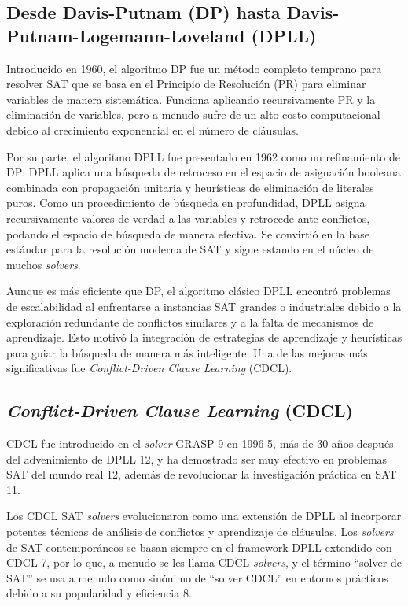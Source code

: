 \subsection{Desde Davis-Putnam (DP) hasta Davis-Putnam-Logemann-Loveland (DPLL)}
Introducido en 1960, el algoritmo DP fue un método completo temprano para resolver SAT que se basa en el Principio de Resolución (PR) para eliminar variables de manera sistemática. Funciona aplicando recursivamente PR y la eliminación de variables, pero a menudo sufre de un alto costo computacional debido al crecimiento exponencial en el número de cláusulas.

Por su parte, el algoritmo DPLL fue presentado en 1962 como un refinamiento de DP: DPLL aplica una búsqueda de retroceso en el espacio de asignación booleana combinada con propagación unitaria y heurísticas de eliminación de literales puros. Como un procedimiento de búsqueda en profundidad, DPLL asigna recursivamente valores de verdad a las variables y retrocede ante conflictos, podando el espacio de búsqueda de manera efectiva. Se convirtió en la base estándar para la resolución moderna de SAT y sigue estando en el núcleo de muchos \textit{solvers}.

Aunque es más eficiente que DP, el algoritmo clásico DPLL encontró problemas de escalabilidad al enfrentarse a instancias SAT grandes o industriales debido a la exploración redundante de conflictos similares y a la falta de mecanismos de aprendizaje. Esto motivó la integración de estrategias de aprendizaje y heurísticas para guiar la búsqueda de manera más inteligente. Una de las mejoras más significativas fue \textit{Conflict-Driven Clause Learning} (CDCL).

\subsection{\textit{Conflict-Driven Clause Learning} (CDCL)}

CDCL fue introducido en el \textit{solver} GRASP 9 en 1996 5, más de 30 años después del advenimiento de DPLL 12, y ha demostrado ser muy efectivo en problemas SAT del mundo real 12, además de revolucionar la investigación práctica en SAT 11.

Los CDCL SAT \textit{solvers} evolucionaron como una extensión de DPLL al incorporar potentes técnicas de análisis de conflictos y aprendizaje de cláusulas. Los \textit{solvers} de SAT contemporáneos se basan siempre en el framework DPLL extendido con CDCL 7, por lo que, a menudo se les llama CDCL \textit{solvers}, y el término ``solver de SAT'' se usa a menudo como sinónimo de ``solver CDCL'' en entornos prácticos debido a su popularidad y eficiencia 8.

